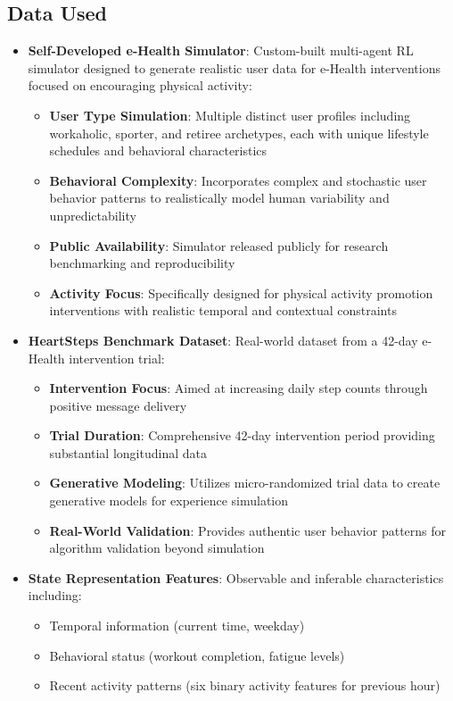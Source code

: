 \subsection*{Data Used}
\begin{itemize}
    \item \textbf{Self-Developed e-Health Simulator}: Custom-built multi-agent RL simulator designed to generate realistic user data for e-Health interventions focused on encouraging physical activity:
    \begin{itemize}
        \item \textbf{User Type Simulation}: Multiple distinct user profiles including workaholic, sporter, and retiree archetypes, each with unique lifestyle schedules and behavioral characteristics
        \item \textbf{Behavioral Complexity}: Incorporates complex and stochastic user behavior patterns to realistically model human variability and unpredictability
        \item \textbf{Public Availability}: Simulator released publicly for research benchmarking and reproducibility
        \item \textbf{Activity Focus}: Specifically designed for physical activity promotion interventions with realistic temporal and contextual constraints
    \end{itemize}
    \item \textbf{HeartSteps Benchmark Dataset}: Real-world dataset from a 42-day e-Health intervention trial:
    \begin{itemize}
        \item \textbf{Intervention Focus}: Aimed at increasing daily step counts through positive message delivery
        \item \textbf{Trial Duration}: Comprehensive 42-day intervention period providing substantial longitudinal data
        \item \textbf{Generative Modeling}: Utilizes micro-randomized trial data to create generative models for experience simulation
        \item \textbf{Real-World Validation}: Provides authentic user behavior patterns for algorithm validation beyond simulation
    \end{itemize}
    \item \textbf{State Representation Features}: Observable and inferable characteristics including:
    \begin{itemize}
        \item Temporal information (current time, weekday)
        \item Behavioral status (workout completion, fatigue levels)
        \item Recent activity patterns (six binary activity features for previous hour)
    \end{itemize}
\end{itemize}

